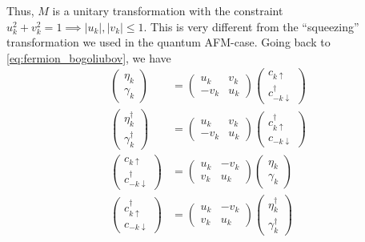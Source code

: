 Thus, $M$ is a unitary transformation with the constraint $u_k^2 + v_k^2 = 1 \implies |u_k|, |v_k| \le 1$. This is very different from the ``squeezing'' transformation we used in the quantum AFM-case.
Going back to \cref{eq:fermion_bogoliubov}, we have
\begin{subequations}
\label{eq:matrix_rep}
\begin{align}
	\begin{pmatrix}
	\eta_k \\ \gamma_k
	\end{pmatrix}
	&= 
	\begin{pmatrix}
		u_k & v_k \\ -v_k & u_k
		\end{pmatrix}
	\begin{pmatrix}
	c_{k\uparrow} \\ c_{-k\downarrow}^\dagger
	\end{pmatrix} \\[1.5ex]
	\begin{pmatrix}
	\eta_k^\dagger \\ \gamma_k^\dagger
	\end{pmatrix}
	&= 
	\begin{pmatrix}
		u_k & v_k \\ -v_k & u_k
		\end{pmatrix}
	\begin{pmatrix}
	c_{k\uparrow}^\dagger \\ c_{-k\downarrow}
	\end{pmatrix} \\[1.5ex]
	\begin{pmatrix}
	c_{k\uparrow} \\ c_{-k\downarrow}^\dagger
	\end{pmatrix}
	&= 
	\begin{pmatrix}
		u_k & -v_k \\ v_k & u_k
		\end{pmatrix}
	\begin{pmatrix}
	\eta_k \\ \gamma_k
	\end{pmatrix} \\[1.5ex]
	\begin{pmatrix}
	c_{k\uparrow}^\dagger \\ c_{-k\downarrow}
	\end{pmatrix}
	&= 
	\begin{pmatrix}
		u_k & -v_k \\ v_k & u_k
		\end{pmatrix}
	\begin{pmatrix}
	\eta_k^\dagger \\ \gamma_k^\dagger
	\end{pmatrix} 
\end{align}
\end{subequations}

